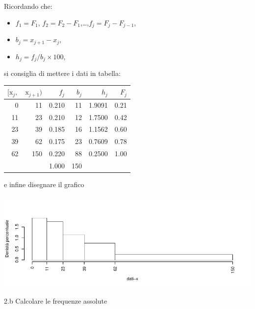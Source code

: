 \documentclass[
  11pt,
]{book}
\providecommand{\tightlist}{%
  \setlength{\itemsep}{0pt}\setlength{\parskip}{0pt}}
\theoremstyle{mytheoremstyle}
\theoremstyle{mydefstyle}
\newenvironment{sol}
  {
  \begin{tcolorbox}[enhanced,breakable,arc=0.1mm,boxrule=1pt,colback=white,colframe=iblue,
  title=\bf \fontfamily{lmss}\selectfont \hspace{.5 cm} Soluzione,drop fuzzy shadow]

}{
\end{tcolorbox}
  }
\begin{document}
\begin{sol}

Ricordando che:

\begin{itemize}
\tightlist
\item
  \(f_1=F_1\), \(f_2=F_2-F_1\),\ldots,\(f_j = F_j-F_{j-1}\),
\item
  \(b_j=x_{j+1}-x_{j}\),
\item
  \(h_j=f_j/b_j\times 100\),
\end{itemize}

si consiglia di mettere i dati in tabella:

\begin{table}[H]
\centering
\begin{tabular}{rrrrrr}
\toprule
$[\text{x}_j,$ & $\text{x}_{j+1})$ & $f_j$ & $b_j$ & $h_j$ & $F_j$\\
\midrule
0 & 11 & 0.210 & 11 & 1.9091 & 0.21\\
11 & 23 & 0.210 & 12 & 1.7500 & 0.42\\
23 & 39 & 0.185 & 16 & 1.1562 & 0.60\\
39 & 62 & 0.175 & 23 & 0.7609 & 0.78\\
62 & 150 & 0.220 & 88 & 0.2500 & 1.00\\
 &  & 1.000 & 150 &  & \\
\bottomrule
\end{tabular}
\end{table}

e infine disegnare il grafico

\begin{center}\includegraphics{Esami_passati_con_soluzioni_files/figure-latex/01-descr-10-1} \end{center}

\end{sol}

2.b Calcolare le frequenze assolute
\end{document}
